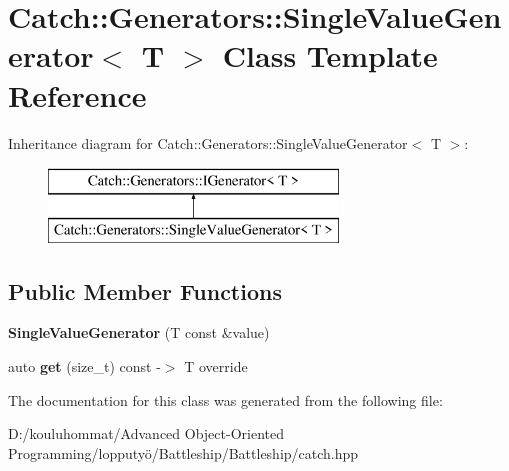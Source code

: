 \hypertarget{class_catch_1_1_generators_1_1_single_value_generator}{}\section{Catch\+:\+:Generators\+:\+:Single\+Value\+Generator$<$ T $>$ Class Template Reference}
\label{class_catch_1_1_generators_1_1_single_value_generator}
Inheritance diagram for Catch\+:\+:Generators\+:\+:Single\+Value\+Generator$<$ T $>$\+:\begin{figure}[H]
\begin{center}
\leavevmode
\includegraphics[height=2.000000cm]{class_catch_1_1_generators_1_1_single_value_generator}
\end{center}
\end{figure}
\subsection*{Public Member Functions}
\begin{DoxyCompactItemize}
\item 
\mbox{\label{class_catch_1_1_generators_1_1_single_value_generator_a4bed2ad14ffe04102d8135e2c82b3ace}} 
{\bfseries Single\+Value\+Generator} (T const \&value)
\item 
\mbox{\label{class_catch_1_1_generators_1_1_single_value_generator_ad03af3fe263136425595bfd2eec84209}} 
auto {\bfseries get} (size\+\_\+t) const -\/$>$ T override
\end{DoxyCompactItemize}


The documentation for this class was generated from the following file\+:\begin{DoxyCompactItemize}
\item 
D\+:/kouluhommat/\+Advanced Object-\/\+Oriented Programming/lopputyö/\+Battleship/\+Battleship/catch.\+hpp\end{DoxyCompactItemize}
